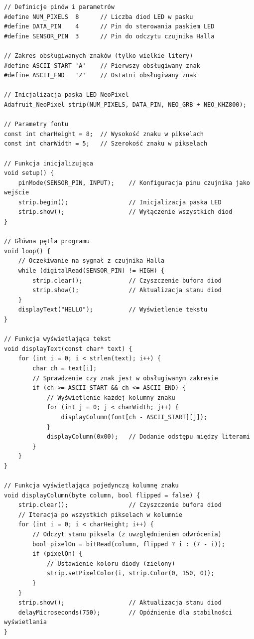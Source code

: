 \documentclass{article}
\begin{document}
\begin{verbatim}
// Definicje pinów i parametrów
#define NUM_PIXELS  8      // Liczba diod LED w pasku
#define DATA_PIN    4      // Pin do sterowania paskiem LED
#define SENSOR_PIN  3      // Pin do odczytu czujnika Halla

// Zakres obsługiwanych znaków (tylko wielkie litery)
#define ASCII_START 'A'    // Pierwszy obsługiwany znak
#define ASCII_END   'Z'    // Ostatni obsługiwany znak

// Inicjalizacja paska LED NeoPixel
Adafruit_NeoPixel strip(NUM_PIXELS, DATA_PIN, NEO_GRB + NEO_KHZ800);

// Parametry fontu
const int charHeight = 8;  // Wysokość znaku w pikselach
const int charWidth = 5;   // Szerokość znaku w pikselach

// Funkcja inicjalizująca
void setup() {
    pinMode(SENSOR_PIN, INPUT);    // Konfiguracja pinu czujnika jako wejście
    strip.begin();                 // Inicjalizacja paska LED
    strip.show();                  // Wyłączenie wszystkich diod
}

// Główna pętla programu
void loop() {
    // Oczekiwanie na sygnał z czujnika Halla
    while (digitalRead(SENSOR_PIN) != HIGH) {
        strip.clear();             // Czyszczenie bufora diod
        strip.show();              // Aktualizacja stanu diod
    }
    displayText("HELLO");          // Wyświetlenie tekstu
}

// Funkcja wyświetlająca tekst
void displayText(const char* text) {
    for (int i = 0; i < strlen(text); i++) {
        char ch = text[i];
        // Sprawdzenie czy znak jest w obsługiwanym zakresie
        if (ch >= ASCII_START && ch <= ASCII_END) {
            // Wyświetlenie każdej kolumny znaku
            for (int j = 0; j < charWidth; j++) {
                displayColumn(font[ch - ASCII_START][j]);
            }
            displayColumn(0x00);   // Dodanie odstępu między literami
        }
    }
}

// Funkcja wyświetlająca pojedynczą kolumnę znaku
void displayColumn(byte column, bool flipped = false) {
    strip.clear();                 // Czyszczenie bufora diod
    // Iteracja po wszystkich pikselach w kolumnie
    for (int i = 0; i < charHeight; i++) {
        // Odczyt stanu piksela (z uwzględnieniem odwrócenia)
        bool pixelOn = bitRead(column, flipped ? i : (7 - i));
        if (pixelOn) {
            // Ustawienie koloru diody (zielony)
            strip.setPixelColor(i, strip.Color(0, 150, 0));
        }
    }
    strip.show();                  // Aktualizacja stanu diod
    delayMicroseconds(750);        // Opóźnienie dla stabilności wyświetlania
}
\end{verbatim}
\end{document}

